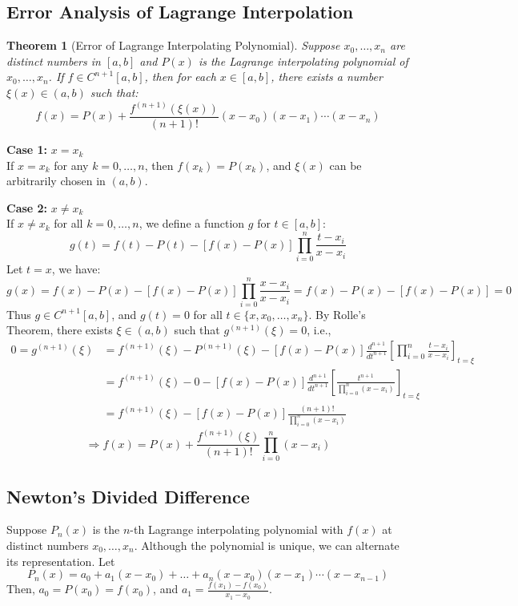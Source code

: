 \documentclass[12pt, a4paper]{article}
\makeatletter
\theoremstyle{break}
\newtheorem{theorem}{Theorem}[section]
\renewenvironment{proof}[1][\proofname]{\par
  \pushQED{\qed}%
  \normalfont \topsep6\p@\@plus6\p@\relax
  \trivlist
  \item[\hskip\labelsep\bfseries #1\@addpunct{.}]\mbox{}\newline\ignorespaces
}{%
  \popQED\endtrivlist\@endpefalse
}
\makeatother
\begin{document}
\subsection{Error Analysis of Lagrange Interpolation}
\begin{theorem}[Error of Lagrange Interpolating Polynomial]
Suppose $x_0, \dots, x_n$ are distinct numbers in $[a,b]$ and $P(x)$ is the Lagrange interpolating polynomial of $x_0, \dots, x_n$. If $f \in C^{n+1}[a,b]$, then for each $x \in [a,b]$, there exists a number $\xi(x) \in (a,b)$ such that:
\[ f(x) = P(x) + \frac{f^{(n+1)}(\xi(x))}{(n+1)!} (x-x_0)(x-x_1)\cdots(x-x_n) \]
\end{theorem}
\begin{proof}
\textbf{Case 1:} $x = x_k$ \\
If $x = x_k$ for any $k = 0, \dots, n$, then $f(x_k) = P(x_k)$, and $\xi(x)$ can be arbitrarily chosen in $(a,b)$.

\textbf{Case 2:} $x \neq x_k$ \\
If $x \neq x_k$ for all $k = 0, \dots, n$, we define a function $g$ for $t \in [a,b]$:
\[ g(t) = f(t) - P(t) - [f(x) - P(x)] \prod_{i=0}^{n} \frac{t-x_i}{x-x_i} \]
Let $t = x$, we have:
\[ g(x) = f(x) - P(x) - [f(x) - P(x)] \prod_{i=0}^{n} \frac{x-x_i}{x-x_i} = f(x) - P(x) - [f(x) - P(x)] = 0 \]
Thus $g \in C^{n+1}[a,b]$, and $g(t) = 0$ for all $t \in \{x, x_0, \dots, x_n\}$.
By Rolle's Theorem, there exists $\xi \in (a,b)$ such that $g^{(n+1)}(\xi) = 0$, i.e.,
\begin{align*}
0 = g^{(n+1)}(\xi) &= f^{(n+1)}(\xi) - P^{(n+1)}(\xi) - [f(x) - P(x)] \frac{d^{n+1}}{dt^{n+1}} \left[ \prod_{i=0}^{n} \frac{t-x_i}{x-x_i} \right]_{t=\xi} \\
&= f^{(n+1)}(\xi) - 0 - [f(x) - P(x)] \frac{d^{n+1}}{dt^{n+1}} \left[ \frac{t^{n+1}}{\prod_{i=0}^{n} (x-x_i)} \right]_{t=\xi} \\
&= f^{(n+1)}(\xi) - [f(x) - P(x)] \frac{(n+1)!}{\prod_{i=0}^{n} (x-x_i)}
\end{align*}
\[ \Rightarrow f(x) = P(x) + \frac{f^{(n+1)}(\xi)}{(n+1)!} \prod_{i=0}^{n} (x-x_i) \]
\end{proof}

\subsection{Newton's Divided Difference}
Suppose $P_n(x)$ is the $n$-th Lagrange interpolating polynomial with $f(x)$ at distinct numbers $x_0, \dots, x_n$. Although the polynomial is unique, we can alternate its representation. Let
\[ P_n(x) = a_0 + a_1(x-x_0) + \dots + a_n(x-x_0)(x-x_1)\cdots(x-x_{n-1}) \]
Then, $a_0 = P(x_0) = f(x_0)$, and $a_1 = \frac{f(x_1) - f(x_0)}{x_1 - x_0}$.
\end{document}
